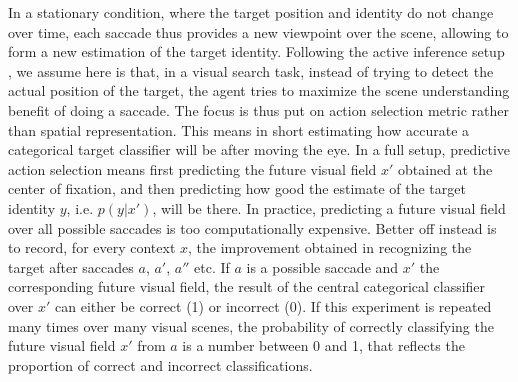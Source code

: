 In a stationary condition, where the target position and identity do not change over time, each saccade thus provides a new viewpoint over the scene, allowing to form a new estimation of the target identity.
Following the active inference setup \cite{Najemnik05, Friston12}, we assume here is that, in a visual search task, instead of trying to detect the actual position of the target, the agent tries to maximize the scene understanding benefit of doing a saccade. The focus is thus put on action selection metric rather than spatial representation. 
This means in short estimating how accurate a categorical target classifier will be after moving the eye.
In a full setup, predictive action selection means first predicting the future visual field $x'$ obtained at the center of fixation, and then predicting how good the  %
estimate of the target identity $y$, i.e. $p(y|x')$, will be there.
In practice, %
predicting a future visual field over all possible saccades is too computationally expensive. %
Better off instead is to record, for every context $x$, the improvement obtained in recognizing the target after saccades $a$, $a'$, $a''$ etc. 
If $a$ is a possible saccade and $x'$ the corresponding future visual field, the result of the central categorical classifier over $x'$ can either be correct (1) or incorrect (0).
If this experiment is repeated many times over many visual scenes, the probability of correctly classifying the future visual field $x'$ from $a$ is a number between 0 and 1, that reflects the proportion of correct and incorrect classifications.

